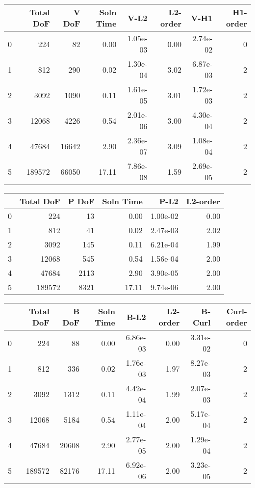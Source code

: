 \documentclass[12pt]{extarticle}
\numberwithin{equation}{section}    %
\begin{document}
\begin{tabular}{lrrrrrrr}
\hline
{} &  Total DoF &  V DoF &  Soln Time &      V-L2 &  L2-order &      V-H1 &  H1-order \\
\hline
0 &        224 &     82 &       0.00 &  1.05e-03 &      0.00 &  2.74e-02 &         0 \\
1 &        812 &    290 &       0.02 &  1.30e-04 &      3.02 &  6.87e-03 &         2 \\
2 &       3092 &   1090 &       0.11 &  1.61e-05 &      3.01 &  1.72e-03 &         2 \\
3 &      12068 &   4226 &       0.54 &  2.01e-06 &      3.00 &  4.30e-04 &         2 \\
4 &      47684 &  16642 &       2.90 &  2.36e-07 &      3.09 &  1.08e-04 &         2 \\
5 &     189572 &  66050 &      17.11 &  7.86e-08 &      1.59 &  2.69e-05 &         2 \\
\hline
\end{tabular}


\begin{tabular}{lrrrrr}
\hline
{} &  Total DoF &  P DoF &  Soln Time &      P-L2 &  L2-order \\
\hline
0 &        224 &     13 &       0.00 &  1.00e-02 &      0.00 \\
1 &        812 &     41 &       0.02 &  2.47e-03 &      2.02 \\
2 &       3092 &    145 &       0.11 &  6.21e-04 &      1.99 \\
3 &      12068 &    545 &       0.54 &  1.56e-04 &      2.00 \\
4 &      47684 &   2113 &       2.90 &  3.90e-05 &      2.00 \\
5 &     189572 &   8321 &      17.11 &  9.74e-06 &      2.00 \\
\hline
\end{tabular}


\begin{tabular}{lrrrrrrr}
\hline
{} &  Total DoF &  B DoF &  Soln Time &      B-L2 &  L2-order &    B-Curl &  Curl-order \\
\hline
0 &        224 &     88 &       0.00 &  6.86e-03 &     0.00 &  3.31e-02 &           0 \\
1 &        812 &    336 &       0.02 &  1.76e-03 &     1.97 &  8.27e-03 &           2 \\
2 &       3092 &   1312 &       0.11 &  4.42e-04 &     1.99 &  2.07e-03 &           2 \\
3 &      12068 &   5184 &       0.54 &  1.11e-04 &     2.00 &  5.17e-04 &           2 \\
4 &      47684 &  20608 &       2.90 &  2.77e-05 &     2.00 &  1.29e-04 &           2 \\
5 &     189572 &  82176 &      17.11 &  6.92e-06 &     2.00 &  3.23e-05 &           2 \\
\hline
\end{tabular}
\end{document}
